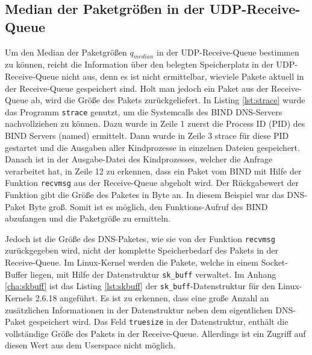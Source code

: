 \documentclass[a4paper, 12pt, BCOR10mm, DIV12, toc=bibliography, toc=listof, german]{scrbook}
\begin{document}

		\subsection*{Median der Paketgrößen in der UDP-Receive-Queue} %

		Um den Median der Paketgrößen $q_{median}$ in der UDP-Receive-Queue bestimmen zu können, reicht
		die Information über den belegten Speicherplatz in der UDP-Receive-Queue nicht aus, denn es ist
		nicht ermittelbar, wieviele Pakete aktuell in der Receive-Queue gespeichert sind. Holt man
		jedoch ein Paket aus der Receive-Queue ab, wird die Größe des Pakets zurückgeliefert. In Listing
		\ref{lst:strace} wurde das Programm \texttt{strace} genutzt, um die Systemcalls des BIND
		DNS-Servers nachvollziehen zu können. Dazu wurde in Zeile 1 zuerst die Process ID (PID) des BIND
		Servers (named) ermittelt. Dann wurde in Zeile 3 strace für diese PID gestartet und die Ausgaben
		aller Kindprozesse in einzelnen Dateien gespeichert. Danach ist in der Ausgabe-Datei des
		Kindprozesses, welcher die Anfrage verarbeitet hat, in Zeile 12 zu erkennen, dass ein Paket vom
		BIND mit Hilfe der Funktion \texttt{recvmsg} aus der Receive-Queue abgeholt wird. Der
		Rückgabewert der Funktion gibt die Größe des Paketes in Byte an. In diesem Beispiel war das
		DNS-Paket \unit[45]{Byte} groß. Somit ist es möglich, den Funktions-Aufruf des BIND abzufangen
		und die Paketgröße zu ermitteln.

		

		Jedoch ist die Größe des DNS-Paketes, wie sie von der Funktion \texttt{recvmsg}
		zurückgegeben wird, nicht der komplette Speicherbedarf des Pakets in der Receive-Queue. Im
		Linux-Kernel werden die Pakete, welche in einem Socket-Buffer liegen, mit Hilfe der
		Datenstruktur \texttt{sk\_buff} verwaltet. Im Anhang \ref{cha:skbuff} ist das Listing
		\ref{lst:skbuff} der \texttt{sk\_buff}-Datenstruktur für den Linux-Kernels 2.6.18 angeführt. Es ist
		zu erkennen, dass eine große Anzahl an zusätzlichen Informationen in der Datenstruktur neben
		dem eigentlichen DNS-Paket gespeichert wird. Das Feld \texttt{truesize} in der Datenstruktur,
		enthält die vollständige Größe des Pakets in der Receive-Queue. Allerdings ist ein Zugriff auf
		diesen Wert aus dem Userspace nicht möglich.
\end{document}
